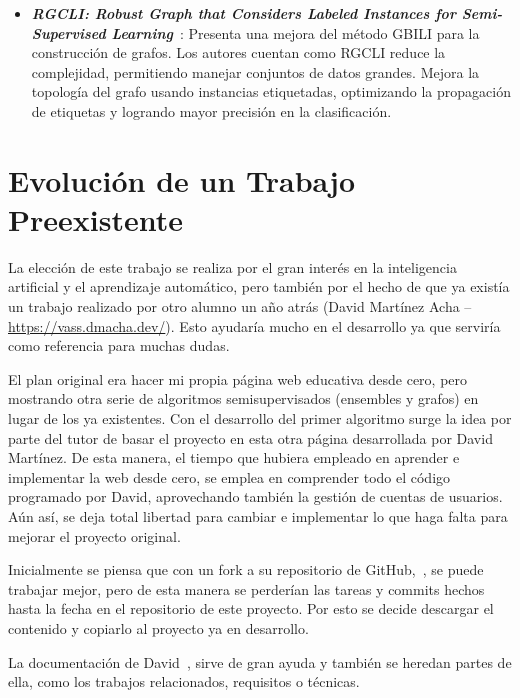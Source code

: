 \begin{itemize}
	\item \textbf{\textit{RGCLI: Robust Graph that Considers Labeled Instances for Semi-Supervised Learning}}~\cite{rgcli}: Presenta una mejora del método GBILI para la construcción de grafos. Los autores cuentan como RGCLI reduce la complejidad, permitiendo manejar conjuntos de datos grandes. Mejora la topología del grafo usando instancias etiquetadas, optimizando la propagación de etiquetas y logrando mayor precisión en la clasificación.
\end{itemize}
\section{Evolución de un Trabajo Preexistente}
La elección de este trabajo se realiza por el gran interés en la inteligencia artificial y el aprendizaje automático, pero también por el hecho de que ya existía un trabajo realizado por otro alumno un año atrás (David Martínez Acha -- \url{https://vass.dmacha.dev/}). Esto ayudaría mucho en el desarrollo ya que serviría como referencia para muchas dudas.

El plan original era hacer mi propia página web educativa desde cero, pero mostrando otra serie de algoritmos semisupervisados (ensembles y grafos) en lugar de los ya existentes. Con el desarrollo del primer algoritmo surge la idea por parte del tutor de basar el proyecto en esta otra página desarrollada por David Martínez. De esta manera, el tiempo que hubiera empleado en aprender e implementar la web desde cero, se emplea en comprender todo el código programado por David, aprovechando también la gestión de cuentas de usuarios. Aún así, se deja total libertad para cambiar e implementar lo que haga falta para mejorar el proyecto original.

Inicialmente se piensa que con un fork a su repositorio de GitHub,~\cite{GH:VASS}, se puede trabajar mejor, pero de esta manera se perderían las tareas y commits hechos hasta la fecha en el repositorio de este proyecto. Por esto se decide descargar el contenido y copiarlo al proyecto ya en desarrollo.

La documentación de David~\cite{TFG:David}, sirve de gran ayuda y también se heredan partes de ella, como los trabajos relacionados, requisitos o técnicas. 

